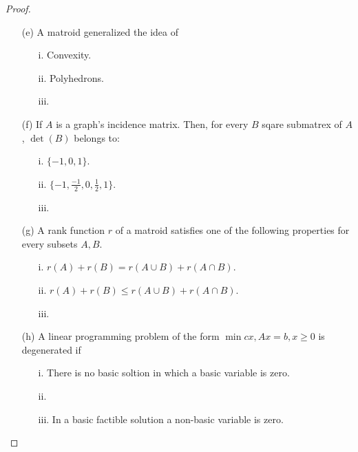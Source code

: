\begin{proof}
\begin{itemize}
        \item[(e)] A matroid generalized the idea of
                    \begin{itemize}
                        \item[i.] Convexity.
                        \item[ii.] Polyhedrons.
                        \item[iii.] 
                    \end{itemize}

        \item[(f)] If $A$ is a graph's incidence matrix. Then, for every $B$ sqare submatrex of $A$, 
                 $\det(B)$ belongs to:
                    \begin{itemize}
                        \item[i.] $\{-1, 0, 1\}$.
                        \item[ii.] $\{-1, \frac{-1}{2}, 0, \frac{1}{2}, 1\}$.
                        \item[iii.] 
                    \end{itemize}

        \item[(g)] A rank function $r$ of a matroid satisfies one of the following properties for every
                subsets $A, B$.
                    \begin{itemize}
                        \item[i.] $r(A) + r(B) = r(A \cup B) + r(A \cap B)$.
                        \item[ii.] $r(A) + r(B) \leq r(A \cup B) + r(A \cap B)$.
                        \item[iii.] 
                    \end{itemize}

        \item[(h)] A linear programming problem of the form $\min cx, Ax = b, x \geq 0$ is degenerated if
                    \begin{itemize}
                        \item[i.] There is no basic soltion in which a basic variable is zero.
                        \item[ii.]  
                        \item[iii.] In a basic factible solution a non-basic variable is zero.
                    \end{itemize}


\end{itemize}
\end{proof}
